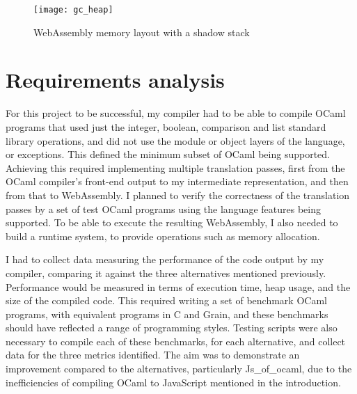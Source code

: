 \hspace{-0.18cm}
\begin{figure}[H]
\texttt{[image: gc\_heap]}
\caption{WebAssembly memory layout with a shadow stack}
\label{fig:wasm-shadow}
\end{figure}





\section{Requirements analysis}
For this project to be successful, my compiler had to be able to compile OCaml programs that used just the integer, boolean, comparison and list standard library operations, and did not use the module or object layers of the language, or exceptions. This defined the minimum subset of OCaml being supported. Achieving this required implementing multiple translation passes, first from the OCaml compiler's front-end output to my intermediate representation, and then from that to WebAssembly. I planned to verify the correctness of the translation passes by a set of test OCaml programs using the language features being supported. To be able to execute the resulting WebAssembly, I also needed to build a runtime system, to provide operations such as memory allocation. 

I had to collect data measuring the performance of the code output by my compiler, comparing it against the three alternatives mentioned previously. Performance would be measured in terms of execution time, heap usage, and the size of the compiled code. This required writing a set of benchmark OCaml programs, with equivalent programs in C and Grain, and these benchmarks should have reflected a range of programming styles. Testing scripts were also necessary to compile each of these benchmarks, for each alternative, and collect data for the three metrics identified. The aim was to demonstrate an improvement compared to the alternatives, particularly Js\_of\_ocaml, due to the inefficiencies of compiling OCaml to JavaScript mentioned in the introduction.




